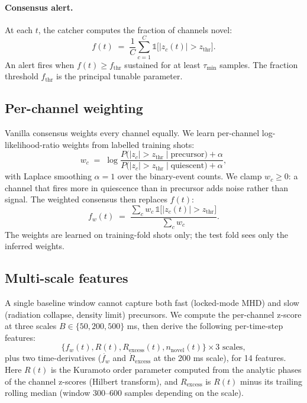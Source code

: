 \documentclass[11pt,letterpaper]{article}
\begin{document}
\paragraph{Consensus alert.} At each $t$, the catcher computes the
fraction of channels novel:
\[
f(t) \;=\; \frac{1}{C} \sum_{c=1}^{C} \mathbb{1}\bigl[|z_c(t)| > z_{\mathrm{thr}}\bigr].
\]
An alert fires when $f(t) \ge f_{\mathrm{thr}}$ sustained for at least
$\tau_{\mathrm{min}}$ samples. The fraction threshold $f_{\mathrm{thr}}$
is the principal tunable parameter.

\subsection{Per-channel weighting}\label{ssec:weighting}

Vanilla consensus weights every channel equally. We learn per-channel
log-likelihood-ratio weights from labelled training shots:
\[
w_c \;=\; \log \frac{P\bigl(|z_c| > z_{\mathrm{thr}} \mid \text{precursor}\bigr) + \alpha}
                    {P\bigl(|z_c| > z_{\mathrm{thr}} \mid \text{quiescent}\bigr) + \alpha},
\]
with Laplace smoothing $\alpha = 1$ over the binary-event counts. We
clamp $w_c \ge 0$: a channel that fires more in quiescence than in
precursor adds noise rather than signal. The weighted consensus then
replaces $f(t)$:
\[
f_w(t) \;=\; \frac{\sum_c w_c \, \mathbb{1}\bigl[|z_c(t)| > z_{\mathrm{thr}}\bigr]}{\sum_c w_c}.
\]
The weights are learned on training-fold shots only; the test fold
sees only the inferred weights.

\subsection{Multi-scale features}\label{ssec:multiscale}

A single baseline window cannot capture both fast (locked-mode MHD) and
slow (radiation collapse, density limit) precursors. We compute the
per-channel z-score at three scales $B \in \{50, 200, 500\}$ ms, then
derive the following per-time-step features:
\[
\bigl\{f_w(t), R(t), R_{\mathrm{excess}}(t), n_{\mathrm{novel}}(t)\bigr\} \times 3 \text{ scales},
\]
plus two time-derivatives ($\dot{f_w}$ and $\dot{R}_{\mathrm{excess}}$
at the 200 ms scale), for 14 features. Here $R(t)$ is the Kuramoto
order parameter computed from the analytic phases of the channel
z-scores (Hilbert transform), and $R_{\mathrm{excess}}$ is $R(t)$ minus
its trailing rolling median (window 300--600 samples depending on the
scale).
\end{document}

